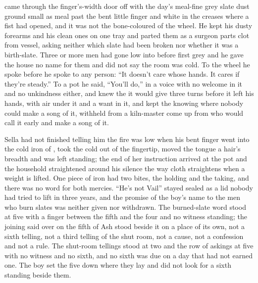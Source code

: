  came through the finger's-width door off  with the day's meal-fine grey slate dust ground small as meal past the bent little finger and white in the creases where a fist had opened, and it was not the bone-coloured  of the wheel. He kept his dusty forearms and his clean ones on one tray and parted them as a surgeon parts clot from vessel, asking neither which slate had been broken nor whether it was a birth-slate. Three or more men had gone low into  before first grey and he gave the house no name for them and did not say the room was cold. To the wheel he spoke before he spoke to any person: “It doesn't care whose hands. It cares if they're steady.” To a pot he said, “You'll do,” in a voice with no welcome in it and no unkindness either, and knew the  it would give three turns before it left his hands, with air under it and a want in it, and kept the knowing where nobody could make a song of it, withheld from a kiln-master come up from  who would call it early and make a song of it.

Sella had not finished telling him the fire was low when his bent finger went into the cold iron of , took the cold out of the fingertip, moved the tongue a hair's breadth and was left standing; the end of her instruction arrived at the pot and the household straightened around his silence the way cloth straightens when a weight is lifted. One piece of iron had two bites, the holding and the taking, and there was no  word for both mercies. “He's not Vail” stayed sealed as a lid nobody had tried to lift in three years, and the promise of the boy's name to the men who burn slates was neither given nor withdrawn. The burned-slate word stood at five with a finger between the fifth and the four and no witness standing; the joining said over  on the fifth of Ash stood beside it on a place of its own, not a sixth telling, not a third telling of the shut room, not a cause, not a confession and not a rule. The shut-room tellings stood at two and the row of askings at five with no witness and no sixth, and no sixth was due on a day that had not earned one. The boy set the five down where they lay and did not look for a sixth standing beside them.

\scenebreak

